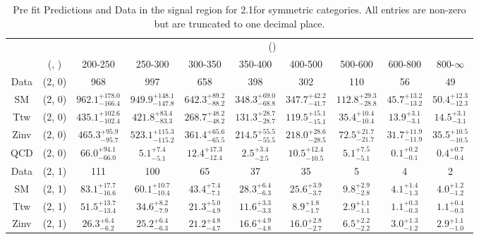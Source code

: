 \begin{table}[h!]
\tiny
\centering
\caption{Pre fit Predictions and Data in the signal region for 2.1\ifb for symmetric categories. All entries are non-zero but are truncated to one decimal place.\label{tab:predallqcdnaive_sig_comb_sym}}
\begin{tabular}
{cccccccccc}
	\hline\hline
	&	& \multicolumn{8}{c}{\scalht (\gev)}\\ 
	&	 (\njet, \nb) & 200-250 & 250-300 & 300-350 & 350-400 & 400-500 & 500-600 & 600-800 & 800-$\infty$ \\ [0.8ex] 
\hline
	Data & (2, 0) & 968 & 997 & 658 & 398 & 302 & 110 & 56 & 49 \\[0.5ex] 
	SM & (2, 0) & $962.1^{+ 178.0 }_{- 166.4 }$ & $949.9^{+ 148.1 }_{- 147.8 }$ & $642.3^{+ 89.2 }_{- 88.2 }$ & $348.3^{+ 69.0 }_{- 68.8 }$ & $347.7^{+ 42.2 }_{- 41.7 }$ & $112.8^{+ 29.3 }_{- 28.8 }$ & $45.7^{+ 13.2 }_{- 13.2 }$ & $50.4^{+ 12.3 }_{- 12.3 }$ \\[0.5ex] 
	Ttw & (2, 0) & $435.1^{+ 102.6 }_{- 102.4 }$ & $421.8^{+ 83.4 }_{- 83.3 }$ & $268.7^{+ 48.2 }_{- 48.2 }$ & $131.3^{+ 28.7 }_{- 28.7 }$ & $119.5^{+ 15.1 }_{- 15.1 }$ & $35.4^{+ 10.4 }_{- 10.4 }$ & $13.9^{+ 3.1 }_{- 3.1 }$ & $14.5^{+ 3.1 }_{- 3.1 }$ \\[0.5ex] 
	Zinv & (2, 0) & $465.3^{+ 95.9 }_{- 95.7 }$ & $523.1^{+ 115.3 }_{- 115.2 }$ & $361.4^{+ 65.6 }_{- 65.5 }$ & $214.5^{+ 55.5 }_{- 55.5 }$ & $218.0^{+ 28.6 }_{- 28.5 }$ & $72.5^{+ 21.7 }_{- 21.7 }$ & $31.7^{+ 11.9 }_{- 11.9 }$ & $35.5^{+ 10.5 }_{- 10.5 }$ \\[0.5ex] 
	QCD & (2, 0) & $66.0^{+ 94.1 }_{- 66.0 }$ & $5.1^{+ 7.4 }_{- 5.1 }$ & $12.4^{+ 17.3 }_{- 12.4 }$ & $2.5^{+ 3.4 }_{- 2.5 }$ & $10.5^{+ 12.4 }_{- 10.5 }$ & $5.1^{+ 7.5 }_{- 5.1 }$ & $0.1^{+ 0.2 }_{- 0.1 }$ & $0.4^{+ 0.7 }_{- 0.4 }$ \\[0.5ex] 
	Data & (2, 1) & 111 & 100 & 65 & 37 & 35 & 5 & 4 & 2 \\[0.5ex] 
	SM & (2, 1) & $83.1^{+ 17.7 }_{- 16.6 }$ & $60.1^{+ 10.7 }_{- 10.4 }$ & $43.4^{+ 7.4 }_{- 7.1 }$ & $28.3^{+ 6.4 }_{- 6.3 }$ & $25.6^{+ 3.9 }_{- 3.7 }$ & $9.8^{+ 2.9 }_{- 2.8 }$ & $4.1^{+ 1.4 }_{- 1.3 }$ & $4.0^{+ 1.2 }_{- 1.2 }$ \\[0.5ex] 
	Ttw & (2, 1) & $51.5^{+ 13.7 }_{- 13.4 }$ & $34.6^{+ 8.2 }_{- 7.9 }$ & $21.3^{+ 5.0 }_{- 4.9 }$ & $11.6^{+ 3.3 }_{- 3.3 }$ & $8.9^{+ 1.8 }_{- 1.7 }$ & $2.9^{+ 1.1 }_{- 1.1 }$ & $1.1^{+ 0.3 }_{- 0.3 }$ & $1.1^{+ 0.4 }_{- 0.3 }$ \\[0.5ex] 
	Zinv & (2, 1) & $26.3^{+ 6.4 }_{- 6.2 }$ & $25.2^{+ 6.4 }_{- 6.3 }$ & $21.2^{+ 4.8 }_{- 4.7 }$ & $16.6^{+ 4.9 }_{- 4.8 }$ & $16.0^{+ 2.8 }_{- 2.7 }$ & $6.5^{+ 2.2 }_{- 2.2 }$ & $3.0^{+ 1.3 }_{- 1.2 }$ & $2.9^{+ 1.1 }_{- 1.0 }$ \\[0.5ex] 

\end{tabular}
\end{table}
